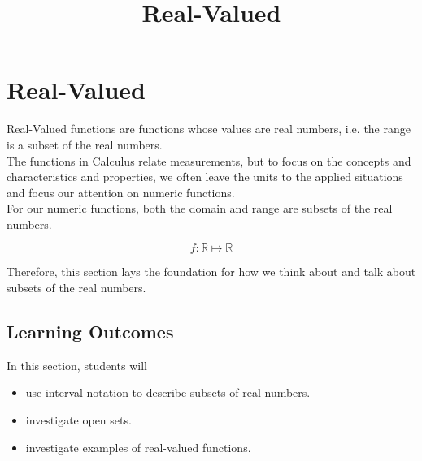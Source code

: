 \documentclass{ximera}
\title{Real-Valued}
\begin{document}
\begin{abstract}
\end{abstract}
\maketitle




\section*{Real-Valued}


Real-Valued functions are functions whose values are real numbers, i.e. the range is a subset of the real numbers. \\


The functions in Calculus relate measurements, but to focus on the concepts and characteristics and properties, we often leave the units to the applied situations and focus our attention on numeric functions. \\


For our numeric functions, both the domain and range are subsets of the real numbers. 

\[
f : \mathbb{R} \mapsto \mathbb{R}
\]


Therefore, this section lays the foundation for how we think about and talk about subsets of the real numbers.










\subsection*{Learning Outcomes}





\begin{sectionOutcomes}
In this section, students will 

\begin{itemize}
\item use interval notation to describe subsets of real numbers.
\item investigate open sets.
\item investigate examples of real-valued functions.
\end{itemize}
\end{sectionOutcomes}
\end{document}

